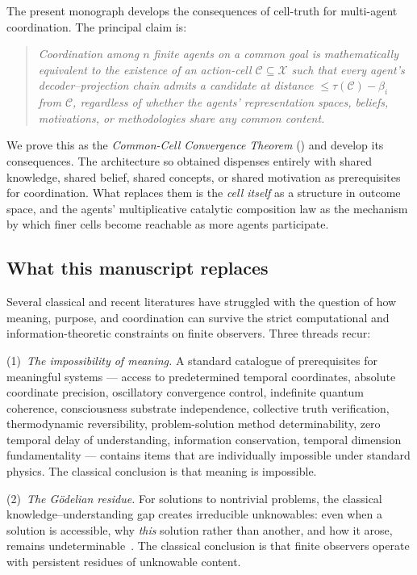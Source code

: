 \documentclass[11pt,twocolumn,a4paper]{article}
\newcommand{\X}{\mathcal{X}}
\newcommand{\Cell}{\mathcal{C}}
\begin{document}
The present monograph develops the consequences of cell-truth for
multi-agent coordination. The principal claim is:

\begin{quote}\itshape
Coordination among $n$ finite agents on a common goal is mathematically
equivalent to the existence of an action-cell $\Cell\subseteq\X$ such
that every agent's decoder--projection chain admits a candidate at
distance $\le\tau(\Cell)-\beta_i$ from $\Cell$, regardless of whether
the agents' representation spaces, beliefs, motivations, or
methodologies share any common content.
\end{quote}

We prove this as the \emph{Common-Cell Convergence Theorem}
() and develop its consequences. The architecture so
obtained dispenses entirely with shared knowledge, shared belief,
shared concepts, or shared motivation as prerequisites for coordination.
What replaces them is the \emph{cell itself} as a structure in outcome
space, and the agents' multiplicative catalytic composition law as the
mechanism by which finer cells become reachable as more agents
participate.

\subsection{What this manuscript replaces}

Several classical and recent literatures have struggled with the
question of how meaning, purpose, and coordination can survive the
strict computational and information-theoretic constraints on finite
observers. Three threads recur:

(1)~\emph{The impossibility of meaning.} A standard catalogue of
prerequisites for meaningful systems --- access to predetermined
temporal coordinates, absolute coordinate precision, oscillatory
convergence control, indefinite quantum coherence, consciousness
substrate independence, collective truth verification, thermodynamic
reversibility, problem-solution method determinability, zero temporal
delay of understanding, information conservation, temporal dimension
fundamentality --- contains items that are individually impossible
under standard physics. The classical conclusion is that meaning is
impossible.

(2)~\emph{The Gödelian residue.} For solutions to nontrivial problems,
the classical knowledge--understanding gap creates irreducible
unknowables: even when a solution is accessible, why \emph{this}
solution rather than another, and how it arose, remains
undeterminable~\cite{godel1931,chaitin1974}. The classical conclusion
is that finite observers operate with persistent residues of unknowable
content.
\end{document}
